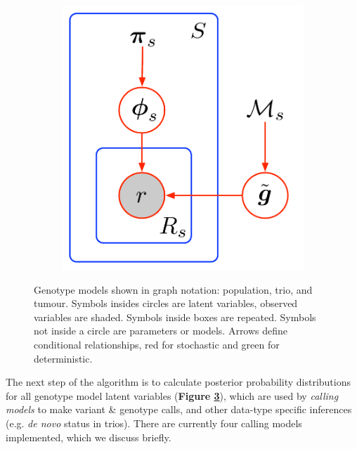\documentclass[notitlepage, twocolumn]{article}
\begin{document}
\begin{figure}[ht]
\begin{subfigure}[b]{0.3\textwidth}
        \caption{}
        \label{fig:trio}
    \end{subfigure}
    \hfill
    \begin{subfigure}[b]{0.3\textwidth}
        \includegraphics[width=\textwidth]{figures/cancer_model}
        \caption{}
        \label{fig:cancer}
    \end{subfigure}
    \caption{Genotype models shown in graph notation: \protect{} population, \protect{} trio, and \protect{} tumour. Symbols insides circles are latent variables, observed variables are shaded. Symbols inside boxes are repeated. Symbols not inside a circle are parameters or models. Arrows define conditional relationships, red for stochastic and green for deterministic.}
    \label{fig:models}
\end{figure}

The next step of the algorithm is to calculate posterior probability distributions for all genotype model latent variables (\textbf{Figure \ref{fig:models}}), which are used by \emph{calling models} to make variant \& genotype calls, and other data-type specific inferences (e.g. \textit{de novo} status in trios). There are currently four calling models implemented, which we discuss briefly.
\end{document}
